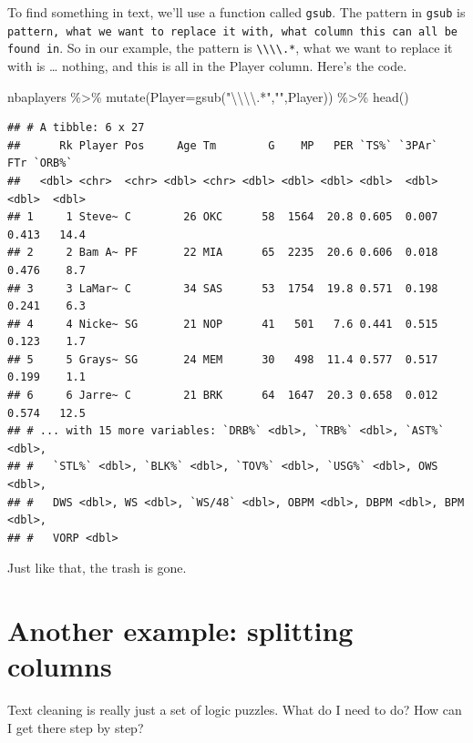 \documentclass[
]{book}
\newenvironment{Shaded}{\begin{snugshade}}{\end{snugshade}}
\newcommand{\AttributeTok}[1]{\textcolor[rgb]{0.77,0.63,0.00}{#1}}
\newcommand{\FunctionTok}[1]{\textcolor[rgb]{0.00,0.00,0.00}{#1}}
\newcommand{\NormalTok}[1]{#1}
\newcommand{\SpecialCharTok}[1]{\textcolor[rgb]{0.00,0.00,0.00}{#1}}
\newcommand{\StringTok}[1]{\textcolor[rgb]{0.31,0.60,0.02}{#1}}
\begin{document}
To find something in text, we'll use a function called \texttt{gsub}. The pattern in \texttt{gsub} is \texttt{pattern,\ what\ we\ want\ to\ replace\ it\ with,\ what\ column\ this\ can\ all\ be\ found\ in}. So in our example, the pattern is \texttt{\textbackslash{}\textbackslash{}\textbackslash{}\textbackslash{}.*}, what we want to replace it with is \ldots{} nothing, and this is all in the Player column. Here's the code.

\begin{Shaded}
\begin{Highlighting}[]
\NormalTok{nbaplayers }\SpecialCharTok{\%\textgreater{}\%} \FunctionTok{mutate}\NormalTok{(}\AttributeTok{Player=}\FunctionTok{gsub}\NormalTok{(}\StringTok{"}\SpecialCharTok{\textbackslash{}\textbackslash{}\textbackslash{}\textbackslash{}}\StringTok{.*"}\NormalTok{,}\StringTok{""}\NormalTok{,Player)) }\SpecialCharTok{\%\textgreater{}\%} \FunctionTok{head}\NormalTok{()}
\end{Highlighting}
\end{Shaded}

\begin{verbatim}
## # A tibble: 6 x 27
##      Rk Player Pos     Age Tm        G    MP   PER `TS%` `3PAr`   FTr `ORB%`
##   <dbl> <chr>  <chr> <dbl> <chr> <dbl> <dbl> <dbl> <dbl>  <dbl> <dbl>  <dbl>
## 1     1 Steve~ C        26 OKC      58  1564  20.8 0.605  0.007 0.413   14.4
## 2     2 Bam A~ PF       22 MIA      65  2235  20.6 0.606  0.018 0.476    8.7
## 3     3 LaMar~ C        34 SAS      53  1754  19.8 0.571  0.198 0.241    6.3
## 4     4 Nicke~ SG       21 NOP      41   501   7.6 0.441  0.515 0.123    1.7
## 5     5 Grays~ SG       24 MEM      30   498  11.4 0.577  0.517 0.199    1.1
## 6     6 Jarre~ C        21 BRK      64  1647  20.3 0.658  0.012 0.574   12.5
## # ... with 15 more variables: `DRB%` <dbl>, `TRB%` <dbl>, `AST%` <dbl>,
## #   `STL%` <dbl>, `BLK%` <dbl>, `TOV%` <dbl>, `USG%` <dbl>, OWS <dbl>,
## #   DWS <dbl>, WS <dbl>, `WS/48` <dbl>, OBPM <dbl>, DBPM <dbl>, BPM <dbl>,
## #   VORP <dbl>
\end{verbatim}

Just like that, the trash is gone.

\hypertarget{another-example-splitting-columns}{%
\section{Another example: splitting columns}\label{another-example-splitting-columns}}

Text cleaning is really just a set of logic puzzles. What do I need to do? How can I get there step by step?
\end{document}
